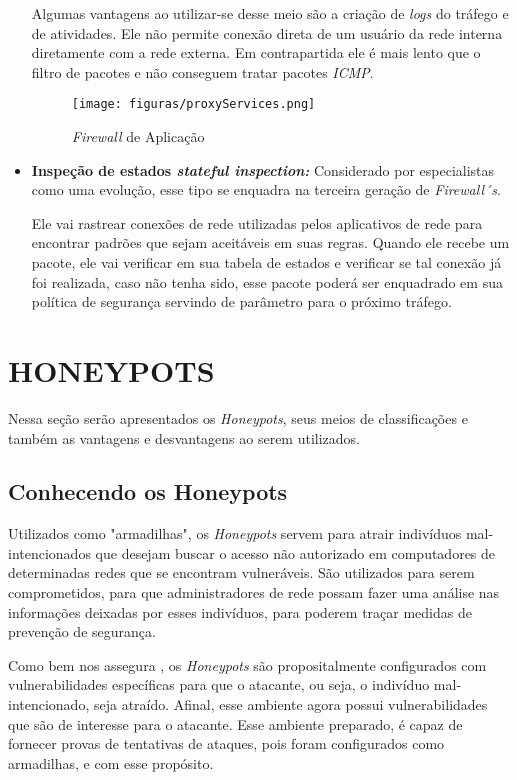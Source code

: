 \begin{itemize}
Algumas vantagens ao utilizar-se desse meio são a criação de \textit{logs} do tráfego e de atividades. Ele não permite conexão direta de um usuário da rede interna diretamente com a rede externa. Em contrapartida ele é mais lento que o filtro de pacotes e não conseguem tratar pacotes \textit{ICMP}.

\begin{figure}[!h]
\centering
\texttt{[image: figuras/proxyServices.png]}
\caption{\textit{Firewall} de Aplicação} 	
\end{figure}

\item \textbf{Inspeção de estados \textit{stateful inspection:}} Considerado por especialistas como uma evolução, esse tipo se enquadra na terceira geração de \textit{Firewall´s}. 

Ele vai rastrear conexões de rede utilizadas pelos aplicativos de rede para encontrar padrões que sejam aceitáveis em suas regras. Quando ele recebe um pacote, ele vai verificar em sua tabela de estados e verificar se tal conexão já foi realizada, caso não tenha sido, esse pacote poderá ser enquadrado em sua política de segurança servindo de parâmetro para o próximo tráfego.

\end{itemize} 

\section{HONEYPOTS}
Nessa seção serão apresentados os \textit{Honeypots}, seus meios de classificações e também as vantagens e desvantagens ao serem utilizados.

\subsection{Conhecendo os Honeypots}
Utilizados como "armadilhas", os \textit{Honeypots} servem para atrair indivíduos mal-intencionados que desejam buscar o acesso não autorizado em computadores de determinadas redes que se encontram vulneráveis. São utilizados para serem comprometidos, para que administradores de rede possam fazer uma análise nas informações deixadas por esses indivíduos, para poderem traçar medidas de prevenção de segurança.

Como bem nos assegura , os \textit{Honeypots} são propositalmente configurados com vulnerabilidades específicas para que o atacante, ou seja, o indivíduo mal-intencionado, seja atraído. Afinal, esse ambiente agora possui vulnerabilidades que são de interesse para o atacante. Esse ambiente preparado, é capaz de fornecer provas de tentativas de ataques, pois foram configurados como armadilhas, e com esse propósito.

